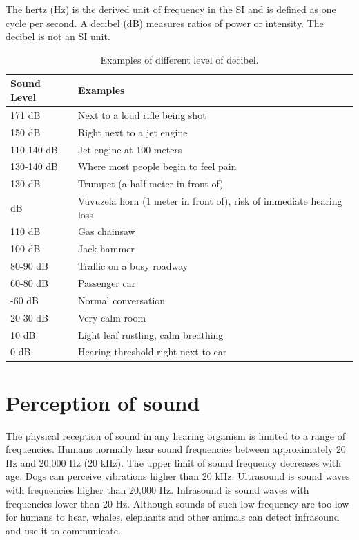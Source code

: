 \documentclass[]{book}
\begin{document}
The hertz (Hz) is the derived unit of frequency in the SI and is defined as one cycle per second. A decibel (dB) measures ratios of power or intensity. The decibel is not an SI unit.

\begin{table}

\caption{\label{tab:db}Examples of different level of decibel.}
\centering
\begin{tabular}[t]{ll}
\toprule
Sound Level & Examples\\
\midrule
171 dB & Next to a loud rifle being shot\\
150 dB & Right next to a jet engine\\
110-140 dB & Jet engine at 100 meters\\
130-140 dB & Where most people begin to feel pain\\
130 dB & Trumpet (a half meter in front of)\\
\addlinespace
120 dB & Vuvuzela horn (1 meter in front of), risk of immediate hearing loss\\
110 dB & Gas chainsaw\\
100 dB & Jack hammer\\
80-90 dB & Traffic on a busy roadway\\
60-80 dB & Passenger car\\
\addlinespace
40-60 dB & Normal conversation\\
20-30 dB & Very calm room\\
10 dB & Light leaf rustling, calm breathing\\
0 dB & Hearing threshold right next to ear\\
\bottomrule
\end{tabular}
\end{table}

\hypertarget{perception-of-sound}{%
\section{Perception of sound}\label{perception-of-sound}}

The physical reception of sound in any hearing organism is limited to a range of frequencies. Humans normally hear sound frequencies between approximately 20 Hz and 20,000 Hz (20 kHz). The upper limit of sound frequency decreases with age. Dogs can perceive vibrations higher than 20 kHz. Ultrasound is sound waves with frequencies higher than 20,000 Hz. Infrasound is sound waves with frequencies lower than 20 Hz. Although sounds of such low frequency are too low for humans to hear, whales, elephants and other animals can detect infrasound and use it to communicate.
\end{document}

